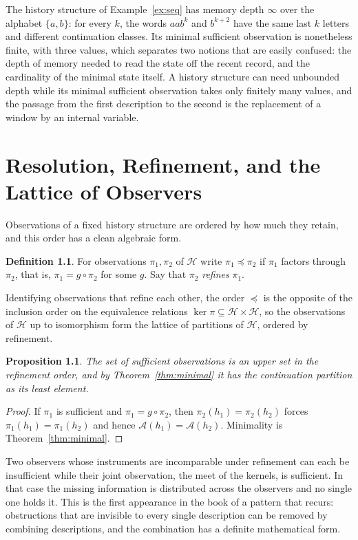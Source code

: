 \documentclass[11pt,oneside]{book}
\newtheorem{proposition}[theorem]{Proposition}
\theoremstyle{definition}
\newtheorem{definition}[theorem]{Definition}
\theoremstyle{remark}
\newcommand{\Hist}{\mathcal{H}}
\newcommand{\Adm}{\mathcal{A}}
\DeclareMathOperator{\Ker}{ker}
\begin{document}
The history structure of Example~\ref{ex:seq} has memory depth $\infty$ over the alphabet $\{a,b\}$: for every $k$, the words $aab^{k}$ and $b^{k+2}$ have the same last $k$ letters and different continuation classes. Its minimal sufficient observation is nonetheless finite, with three values, which separates two notions that are easily confused: the depth of memory needed to read the state off the recent record, and the cardinality of the minimal state itself. A history structure can need unbounded depth while its minimal sufficient observation takes only finitely many values, and the passage from the first description to the second is the replacement of a window by an internal variable.

\chapter{Resolution, Refinement, and the Lattice of Observers}\label{ch:resolution}

Observations of a fixed history structure are ordered by how much they retain, and this order has a clean algebraic form.

\begin{definition}
For observations $\pi_1,\pi_2$ of $\Hist$ write $\pi_1\preceq\pi_2$ if $\pi_1$ factors through $\pi_2$, that is, $\pi_1=g\circ\pi_2$ for some $g$. Say that $\pi_2$ \emph{refines} $\pi_1$.
\end{definition}

Identifying observations that refine each other, the order $\preceq$ is the opposite of the inclusion order on the equivalence relations $\Ker\pi\subseteq\Hist\times\Hist$, so the observations of $\Hist$ up to isomorphism form the lattice of partitions of $\Hist$, ordered by refinement.

\begin{proposition}\label{prop:upward}
The set of sufficient observations is an upper set in the refinement order, and by Theorem~\ref{thm:minimal} it has the continuation partition as its least element.
\end{proposition}

\begin{proof}
If $\pi_1$ is sufficient and $\pi_1=g\circ\pi_2$, then $\pi_2(h_1)=\pi_2(h_2)$ forces $\pi_1(h_1)=\pi_1(h_2)$ and hence $\Adm(h_1)=\Adm(h_2)$. Minimality is Theorem~\ref{thm:minimal}.
\end{proof}

Two observers whose instruments are incomparable under refinement can each be insufficient while their joint observation, the meet of the kernels, is sufficient. In that case the missing information is distributed across the observers and no single one holds it. This is the first appearance in the book of a pattern that recurs: obstructions that are invisible to every single description can be removed by combining descriptions, and the combination has a definite mathematical form.
\end{document}
